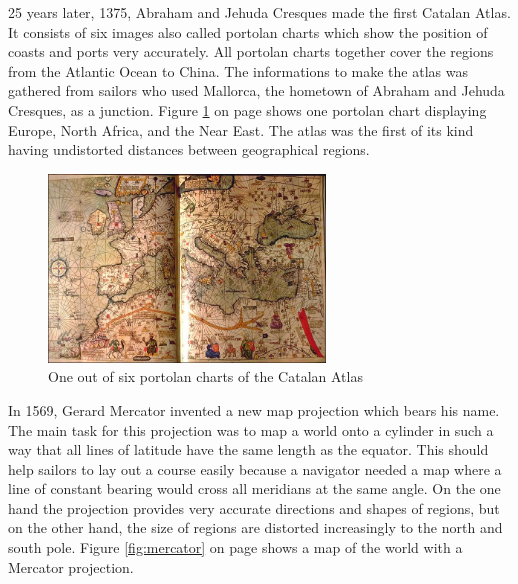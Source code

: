 25 years later, 1375, Abraham and Jehuda Cresques made the first Catalan Atlas. It consists of six images also called portolan charts which show the position of coasts and ports very accurately. All portolan charts together cover the regions from the Atlantic Ocean to China. The informations to make the atlas was gathered from sailors who used Mallorca, the hometown of Abraham and Jehuda Cresques, as a junction. Figure \ref{fig:catalan-atlas} on page \pageref{fig:catalan-atlas} shows one portolan chart displaying Europe, North Africa, and the Near East. The atlas was the first of its kind having undistorted distances between geographical regions.

\begin{figure}[!htb]
\centering
\includegraphics[height=5cm,keepaspectratio]{images/history/catalan-atlas.jpg}
\caption[
    One out of six portolan charts of the Catalan Atlas, Urldate: 07.2016 \newline
\small\texttt{\url{http://datavis.ca/milestones//admin/uploads/images/CatalanE.jpg}}
]{One out of six portolan charts of the Catalan Atlas}
\label{fig:catalan-atlas}
\end{figure}

In 1569, Gerard Mercator invented a new map projection which bears his name. The main task for this projection was to map a world onto a cylinder in such a way that all lines of latitude have the same length as the equator. This should help sailors to lay out a course easily because a navigator needed a map where a line of constant bearing would cross all meridians at the same angle. On the one hand the projection provides very accurate directions and shapes of regions, but on the other hand, the size of regions are distorted increasingly to the north and south pole. Figure \ref{fig:mercator} on page \pageref{fig:mercator} shows a map of the world with a Mercator projection.

